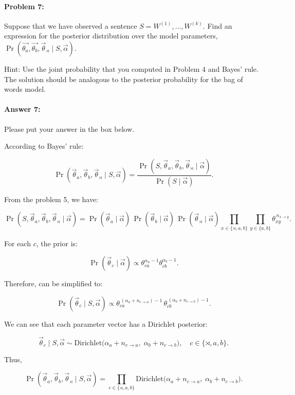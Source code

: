 \documentclass[10pt]{article}
\newenvironment{AnswerBox}{\begin{mdframed}[style=simple]}{\end{mdframed}}
\begin{document}
\hrulefill %

\paragraph{Problem 7:}

Suppose that we have observed a sentence
$S=W^{(1)},\dots,W^{(k)}$. Find an expression for the posterior
distribution over the model parameters,
$\Pr(\vec{\theta_a}, \vec{\theta_b}, \vec{\theta}_{\rtimes} \mid S,
\vec{\alpha})$.

 Hint: Use the joint probability that you computed in Problem
4 and Bayes' rule. The solution should be analogous to the posterior
probability for the bag of words model.

\paragraph{Answer 7:}  Please put your answer in the box below.


\begin{AnswerBox}%


    According to Bayes' rule:
    
    \[
    \Pr(\vec\theta_a,\vec\theta_b,\vec\theta_{\rtimes} \mid S,\vec\alpha)
    =
    \frac{\Pr(S,\vec\theta_a,\vec\theta_b,\vec\theta_{\rtimes}\mid\vec\alpha)} {\Pr(S\mid\vec\alpha)}.
    \]
    
    From the problem 5, we have:
    
    \[
    \Pr(S,\vec\theta_a,\vec\theta_b,\vec\theta_{\rtimes}\mid\vec\alpha)
    =
    \Pr(\vec\theta_a\mid\vec\alpha)\,
    \Pr(\vec\theta_b\mid\vec\alpha)\,
    \Pr(\vec\theta_{\rtimes}\mid\vec\alpha)
    \prod_{x\in\{\rtimes,a,b\}}
    \prod_{y\in\{a,b\}}
    \theta_{xy}^{\,n_{x\to y}}.
    \]
    
    For each $c$, the prior is:
    
    \[
    \Pr(\vec\theta_c\mid\vec\alpha)
    \propto \theta_{ca}^{\alpha_a-1}\theta_{cb}^{\alpha_b-1}.
    \]
    
    Therefore, can be simplified to:
    
    \[
    \Pr(\vec\theta_c \mid S,\vec\alpha)
    \propto \theta_{ca}^{\,(\alpha_a + n_{c\to a}) - 1}\,
    \theta_{cb}^{\,(\alpha_b + n_{c\to b}) - 1}.
    \]
    
    We can see that each parameter vector has a Dirichlet posterior:
    
    \[
    \vec\theta_c \mid S,\vec\alpha
    \sim
    \text{Dirichlet}(\alpha_a + n_{c\to a},\; \alpha_b + n_{c\to b}\bigr),
    \quad c\in\{\rtimes,a,b\}.
    \]
    
    Thus,
    
    \[
    \Pr(\vec\theta_a,\vec\theta_b,\vec\theta_{\rtimes}\mid S,\vec\alpha)
    =
    \prod_{c\in\{\rtimes,a,b\}}
    \text{Dirichlet}(\alpha_a + n_{c\to a},\; \alpha_b + n_{c\to b}\bigr).
    \]
    
    
\end{AnswerBox}%
\end{document}
